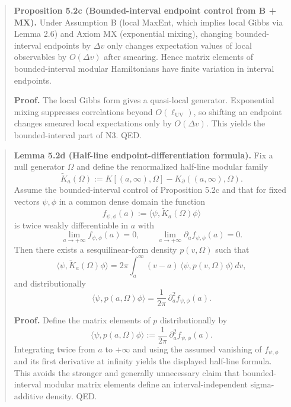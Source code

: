 \begin{quote}
\textbf{Proposition 5.2c (Bounded-interval endpoint control from B + MX).} Under Assumption B (local MaxEnt, which implies local Gibbs via Lemma 2.6) and Axiom MX (exponential mixing), changing bounded-interval endpoints by \(\Delta v\) only changes expectation values of local observables by \(O(\Delta v)\) after smearing. Hence matrix elements of bounded-interval modular Hamiltonians have finite variation in interval endpoints.

\textbf{Proof.} The local Gibbs form gives a quasi-local generator. Exponential mixing suppresses correlations beyond \(O(\ell_{\mathrm{UV}})\), so shifting an endpoint changes smeared local expectations only by \(O(\Delta v)\). This yields the bounded-interval part of N3. QED.
\end{quote}

\begin{quote}
\textbf{Lemma 5.2d (Half-line endpoint-differentiation formula).} Fix a null generator \(\Omega\) and define the renormalized half-line modular family
\[
\widetilde K_a(\Omega) := K[(a,\infty),\Omega] - K_\partial((a,\infty),\Omega).
\]
Assume the bounded-interval control of Proposition 5.2c and that for fixed vectors \(\psi,\phi\) in a common dense domain the function
\[
f_{\psi,\phi}(a) := \langle \psi, \widetilde K_a(\Omega)\phi \rangle
\]
is twice weakly differentiable in \(a\) with
\[
\lim_{a\to +\infty} f_{\psi,\phi}(a) = 0,
\qquad
\lim_{a\to +\infty} \partial_a f_{\psi,\phi}(a) = 0.
\]
Then there exists a sesquilinear-form density \(p(v,\Omega)\) such that
\[
\langle \psi,\widetilde K_a(\Omega)\phi \rangle
=
2\pi \int_a^\infty (v-a)\,\langle \psi,p(v,\Omega)\phi \rangle\,dv,
\]
and distributionally
\[
\langle \psi,p(a,\Omega)\phi \rangle
=
\frac{1}{2\pi}\,\partial_a^2 f_{\psi,\phi}(a).
\]

\textbf{Proof.} Define the matrix elements of \(p\) distributionally by
\[
\langle \psi,p(a,\Omega)\phi \rangle
:=
\frac{1}{2\pi}\,\partial_a^2 f_{\psi,\phi}(a).
\]
Integrating twice from \(a\) to \(+\infty\) and using the assumed vanishing of \(f_{\psi,\phi}\) and its first derivative at infinity yields the displayed half-line formula. This avoids the stronger and generally unnecessary claim that bounded-interval modular matrix elements define an interval-independent sigma-additive density. QED.
\end{quote}

